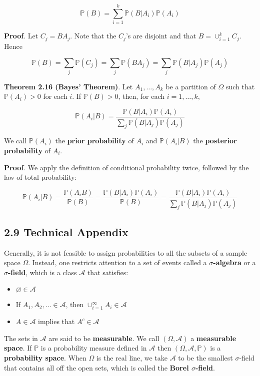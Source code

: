 \[ \mathbb{P}(B) = \sum_{i=1}^k \mathbb{P}(B | A_i) \mathbb{P}(A_i) \]

\textbf{Proof}. Let \(C_j = BA_j\). Note that the \(C_j\)'s are disjoint
and that \(B = \cup_{i=1}^k C_j\). Hence

\[ \mathbb{P}(B) = \sum_j \mathbb{P}(C_j)  = \sum_j \mathbb{P}(BA_j) = \sum_j \mathbb{P}(B | A_j) \mathbb{P}(A_j) \]

\textbf{Theorem 2.16 (Bayes' Theorem)}. Let \(A_1, \dots, A_k\) be a
partition of \(\Omega\) such that \(\mathbb{P}(A_i) > 0\) for each
\(i\). If \(\mathbb{P}(B) > 0\), then, for each \(i = 1, \dots, k\),

\[ \mathbb{P}(A_i | B) = \frac{\mathbb{P}(B | A_i) \mathbb{P}(A_i)}{\sum_j \mathbb{P}(B | A_j) \mathbb{P}(A_j)} \]

We call \(\mathbb{P}(A_i)\) the \textbf{prior probability} of \(A_i\)
and \(\mathbb{P}(A_i | B)\) the \textbf{posterior probability} of
\(A_i\).

\textbf{Proof}. We apply the definition of conditional probability
twice, followed by the law of total probability:

\[ \mathbb{P}(A_i | B) = \frac{\mathbb{P}(A_i B) }{\mathbb{P}(B)} = \frac{\mathbb{P}(B | A_i) \mathbb{P}(A_i)}{\mathbb{P}(B)} = \frac{\mathbb{P}(B | A_i) \mathbb{P}(A_i)}{\sum_j \mathbb{P}(B | A_j) \mathbb{P}(A_j)}\]

\subsection{2.9 Technical Appendix}\label{technical-appendix}

Generally, it is not feasible to assign probabilities to all the subsets
of a sample space \(\Omega\). Instead, one restricts attention to a set
of events called a \textbf{\(\sigma\)-algebra} or a
\textbf{\(\sigma\)-field}, which is a class \(\mathcal{A}\) that
satisfies:

\begin{itemize}[tightlist]
\item
  \(\varnothing \in \mathcal{A}\)
\item
  If \(A_1, A_2, \dots \in \mathcal{A}\), then
  \(\cup_{i=1}^\infty A_i \in \mathcal{A}\)
\item
  \(A \in \mathcal{A}\) implies that \(A^c \in \mathcal{A}\)
\end{itemize}

The sets in \(\mathcal{A}\) are said to be \textbf{measurable}. We call
\((\Omega, \mathcal{A})\) a \textbf{measurable space}. If \(\mathbb{P}\)
is a probability measure defined in \(\mathcal{A}\) then
\((\Omega, \mathcal{A}, \mathbb{P})\) is a \textbf{probability space}.
When \(\Omega\) is the real line, we take \(\mathcal{A}\) to be the
smallest \(\sigma\)-field that contains all off the open sets, which is
called the \textbf{Borel \(\sigma\)-field}.

